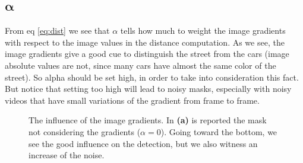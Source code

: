 \subsection*{$\bm{\alpha}$}
From eq \ref{eq:dist} we see that $\alpha$ tells how much to weight the image gradients
with respect to the image values in the distance computation.
As we see, the image gradients give a good cue to distinguish the street from the cars
(image absolute values are not, since many cars have almost the same color of the
street). So alpha should be set high, in order to take into consideration this fact.
But notice that setting too high will lead to noisy masks, especially with noisy
videos that have small variations of the gradient from frame to frame.
\begin{figure}[!t]
    \centering
    \newline
    \newline
    \newline
    \caption{The influence of the image gradients. In \textbf{(a)} is reported the mask not considering the gradients ($\alpha = 0$). Going toward the bottom, we see the good influence on the detection, but we also witness an increase of the noise.}
\end{figure}

